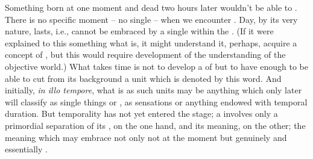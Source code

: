 Something born at one moment and dead two hours later wouldn't be able to
 . There is no specific moment -- no single  --
when we encounter . Day, by its very nature, lasts, i.e., cannot be
embraced by a single  within the \hoa. (If it were explained to this
something what  is, it might understand it, perhaps, acquire a
concept of , but this would require development of the understanding
of the objective world.) What takes time is not
to develop a  of  but to have enough  to
be able to {cut} from its background a unit which is denoted by this word.
And initially, {\em in illo tempore}, what is  as such units may
be anything which only later  will classify as single things or
, as  sensations or anything endowed with temporal
duration. But temporality has not yet entered the stage; a  involves
only a primordial separation of its , on the one hand, and its
meaning, on the other; the meaning which may embrace  not only
not  at the moment but genuinely and essentially .

